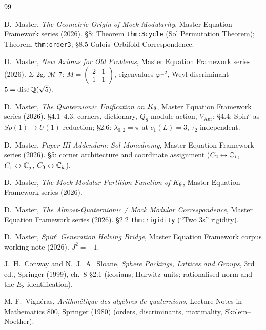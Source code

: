 \documentclass[11pt,a4paper]{article}
\theoremstyle{plain}
\theoremstyle{definition}
\theoremstyle{remark}
\DeclareMathOperator{\disc}{disc}
\begin{document}
\begin{thebibliography}{99}

 D.~Master, \emph{The Geometric Origin of Mock Modularity}, Master Equation Framework series (2026). \S8: Theorem \texttt{thm:3cycle} (Sol Permutation Theorem); Theorem \texttt{thm:order3}; \S8.5 Galois--Orbifold Correspondence.

 D.~Master, \emph{New Axioms for Old Problems}, Master Equation Framework series (2026). $\Sigma$-2g, $\mathcal{M}$-7: $M = \left(\begin{smallmatrix}2&1\\1&1\end{smallmatrix}\right)$, eigenvalues $\varphi^{\pm2}$, Weyl discriminant $5 = \disc\Q(\sqrt5)$.

 D.~Master, \emph{The Quaternionic Unification on $K_8$}, Master Equation Framework series (2026). \S4.1--4.3: corners, dictionary, $Q_8$ module action, $V_{\mathrm{Aut}}$; \S4.4: Spin$^c$ as $Sp(1) \to U(1)$ reduction; \S2.6: $\lambda_{0,2} = \pi$ at $c_1(L) = 3$, $\tau_2$-independent.

 D.~Master, \emph{Paper III Addendum: Sol Monodromy}, Master Equation Framework series (2026). \S5: corner architecture and coordinate assignment ($C_2 \leftrightarrow \mathbb{C}_i$, $C_1 \leftrightarrow \mathbb{C}_j$, $C_3 \leftrightarrow \mathbb{C}_k$).

 D.~Master, \emph{The Mock Modular Partition Function of $K_8$}, Master Equation Framework series (2026).

 D.~Master, \emph{The Almost-Quaternionic / Mock Modular Correspondence}, Master Equation Framework series (2026). \S2.2 \texttt{thm:rigidity} (``Two 3s'' rigidity).

 D.~Master, \emph{Spin$^c$ Generation Halving Bridge}, Master Equation Framework corpus working note (2026). $J^2 = -1$.

 J.~H.~Conway and N.~J.~A.~Sloane, \emph{Sphere Packings, Lattices and Groups}, 3rd ed., Springer (1999), ch.~8 \S2.1 (icosians; Hurwitz units; rationalised norm and the $E_8$ identification).

 M.-F.~Vign\'eras, \emph{Arithm\'etique des alg\`ebres de quaternions}, Lecture Notes in Mathematics 800, Springer (1980) (orders, discriminants, maximality, Skolem--Noether).


\end{thebibliography}
\end{document}
